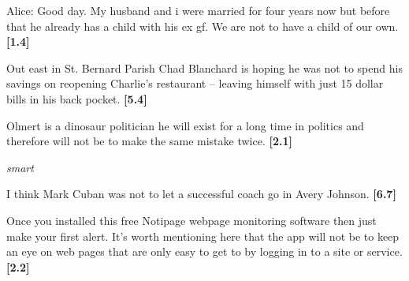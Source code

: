 \documentclass[11pt,fleqn]{article}
\newcommand{\6}{\mbox{$[\hspace*{-.6mm}[$}}
\newcommand{\9}{\mbox{$]\hspace*{-.6mm}]$}}
\begin{document}
\begin{exe}
\begin{xlist}
\ex Alice: Good day. My husband and i were married for four years now but before that he already has a child with his ex gf. We are not  to have a child of our own. \hfill {\bf [1.4]}

\end{xlist}



\begin{xlist} \ex Out east in St. Bernard Parish Chad Blanchard is
hoping he was not  to spend his savings on reopening
Charlie's restaurant -- leaving himself with just 15 dollar bills in his
back pocket. \hfill {\bf [5.4]}


\ex Olmert is a dinosaur politician  he will exist for a long time in politics  and therefore will not be  to make the same mistake twice. \hfill {\bf [2.1]}

\end{xlist}

\ex\label{smart} {\em smart}

\begin{xlist}

\ex I think Mark Cuban was not  to let a successful coach go in Avery Johnson. \hfill {\bf [6.7]}


\ex Once you installed this free Notipage webpage monitoring software
then just make your first alert. It's worth mentioning here that the app
will not be  to keep an eye on web pages that are only easy
to get to by logging in to a site or service.   \hfill {\bf [2.2]}

\end{xlist}

\end{exe}
\end{document}
